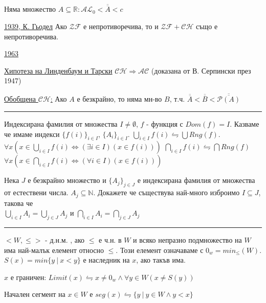 \documentclass[fleqn, titlepage, 12pt]{report}
\begin{document}
\bigbreak

Няма множество $ A \subseteq \mathbb{R} : \mathcal{AL}_0 < \overline{\overline{A}} < c$ 
\bigbreak

\underline{1939, К. Гьодел}  Ако $\mathcal{ZF}$ е непротиворечива, то и $ \mathcal{ZF} + \mathcal{CH}$
също е непротиворечива.

\underline{1963} 

\bigbreak
\underline{Хипотеза на Линденбаум и Тарски} $ \mathcal{CH} \Rightarrow \mathcal{AC} $
(доказана от В. Серпински през 1947)

\underline{Обобщена $\mathcal{CH}$:} Ако $A$ е безкрайно, то няма мн-во $B$, т.ч.
$\overline{\overline{A}} < \overline{\overline{B}} < \overline{\overline{\mathcal{P}(A)}}$

\bigbreak
\hrule
\bigbreak

 Индексирана фамилия от множества $I \neq \emptyset$, $f$ - функция с $Dom(f) = I$.
Казваме че имаме индекси $\{ f(i) \}_{i \in I}$, $\{ A_i \}_{i \in I}$.
$ \bigcup_{i \in I} f(i) \leftrightharpoons \bigcup Rng(f) $.
\bigbreak
$ \forall{x}(x \in \bigcup_{i \in I} f(i) \Leftrightarrow (\exists{i \in I})(x \in f(i))) $
$\bigcap_{i \in I} f(i) \leftrightharpoons \bigcap Rng(f)$
$\forall{x}(x \in \bigcap_{i \in I} f(i) \Leftrightarrow (\forall{i \in I})(x \in f(i)))$

\bigbreak
{} Нека $ J $ е безкрайно множество и $ \{ A_j \}_{j \in J} $ е индексирана фамилия от множества от естествени числа.
$ A_j \subseteq \mathbb{N} $. Докажете че съществува най-много изброимо $ I \subseteq J $, такова че \\
$ \bigcup_{i \in I} A_i = \bigcup_{j \in J} A_j$ и $ \bigcap_{i \in I} A_i = \bigcap_{j \in J} A_j$
\bigbreak

\hrule
\begin{center}
\end{center}

$ <W, \leq> $ - д.н.м. , ако $ \leq $ е ч.н. в $ W $ и всяко непразно подмножество на $ W $ има най-малък елемент
относно $ \leq $. Този елемент означаваме с $ 0_w = min_{\leq}(W)$. $ S(x) = min \{y\ |\ x < y\} $
е наследник на $ x $, ако такъв има.
\bigbreak

$ x $ е граничен: $ Limit(x) \leftrightharpoons x \neq 0_w \land \forall{y \in W} (x \neq S(y))$
\bigbreak

Начален сегмент на $ x \in W $ е $ seg(x) \leftrightharpoons \{y\ |\ y \in W \land y < x\} $
\end{document}
